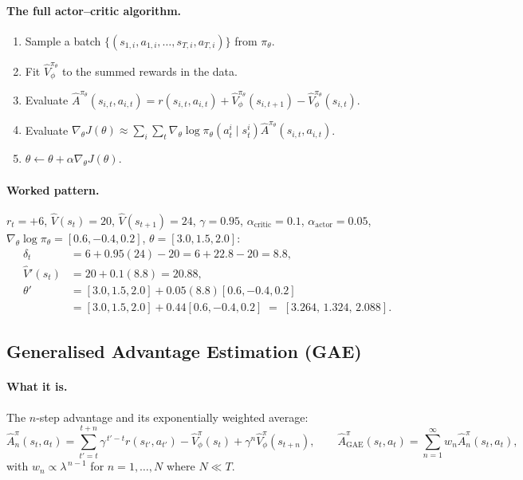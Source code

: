 \documentclass[11pt,a4paper]{article}
\begin{document}
\paragraph{The full actor--critic algorithm.}
\begin{enumerate}[label=\arabic*.]
\item Sample a batch $\{(s_{1,i},a_{1,i},\dots,s_{T,i},a_{T,i})\}$ from $\pi_\theta$.
\item Fit $\hat V^{\pi_\theta}_\phi$ to the summed rewards in the data.
\item Evaluate $\hat A^{\pi_\theta}(s_{i,t},a_{i,t})=r(s_{i,t},a_{i,t})+\hat V^{\pi_\theta}_\phi(s_{i,t+1})-\hat V^{\pi_\theta}_\phi(s_{i,t})$.
\item Evaluate $\nabla_\theta J(\theta)\approx\sum_i\sum_t\nabla_\theta\log\pi_\theta(a^i_t\mid s^i_t)\hat A^{\pi_\theta}(s_{i,t},a_{i,t})$.
\item $\theta\leftarrow\theta+\alpha\nabla_\theta J(\theta)$.
\end{enumerate}

\paragraph{Worked pattern.} $r_t=+6$, $\hat V(s_t)=20$, $\hat V(s_{t+1})=24$,
$\gamma=0.95$, $\alpha_{\text{critic}}=0.1$, $\alpha_{\text{actor}}=0.05$,
$\nabla_\theta\log\pi_\theta=[0.6,-0.4,0.2]$, $\theta=[3.0,1.5,2.0]$:
\begin{align*}
\delta_t &= 6+0.95(24)-20 = 6+22.8-20 = 8.8,\\
\hat V'(s_t) &= 20+0.1(8.8)=20.88,\\
\theta' &= [3.0,1.5,2.0]+0.05(8.8)[0.6,-0.4,0.2]\\
&= [3.0,1.5,2.0]+0.44[0.6,-0.4,0.2]\;=\;[3.264,\,1.324,\,2.088].
\end{align*}

\subsection{Generalised Advantage Estimation (GAE)}

\paragraph{What it is.} The $n$-step advantage and its exponentially weighted
average:
\[
\hat A^\pi_n(s_t,a_t)=\sum_{t'=t}^{t+n}\gamma^{\,t'-t}r(s_{t'},a_{t'})
-\hat V^\pi_\phi(s_t)+\gamma^{n}\hat V^\pi_\phi(s_{t+n}),
\qquad
\hat A^\pi_{\mathrm{GAE}}(s_t,a_t)=\sum_{n=1}^{\infty} w_n\hat A^\pi_n(s_t,a_t),
\]
with $w_n\propto\lambda^{\,n-1}$ for $n=1,\dots,N$ where $N\ll T$.
\end{document}
